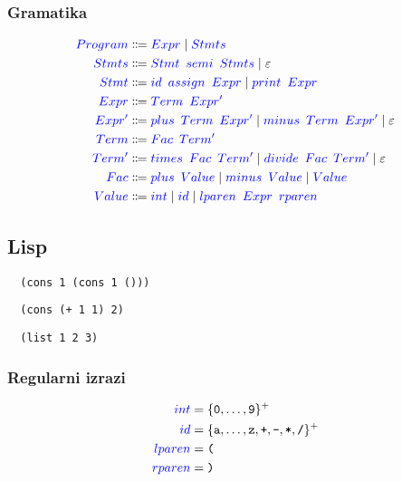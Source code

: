 \documentclass{article}
\newcommand{\Symbol}[1]{\textcolor{blue}{#1}}
\newcommand{\Null}{\varepsilon}
\newcommand{\Char}[1]{\texttt{#1}}
\newcommand{\Arrow}{\Coloneq}
\newcommand{\Seq}{{\ \,}}
\newcommand{\Union}{\mathrel{|}}
\newcommand{\KleenePlus}[1]{#1^+}
\begin{document}
\subsubsection*{Gramatika}
\begin{equation*}
  \begin{aligned}
    \Symbol{Program} &\Arrow \Symbol{Expr} \Union \Symbol{Stmts}\\
    \Symbol{Stmts} &\Arrow \Symbol{Stmt} \Seq \Symbol{semi} \Seq \Symbol{Stmts} \Union \Null\\
    \Symbol{Stmt} &\Arrow \Symbol{id} \Seq \Symbol{assign} \Seq \Symbol{Expr} \Union \Symbol{print} \Seq \Symbol{Expr}\\
    \Symbol{Expr} &\Arrow \Symbol{Term} \Seq \Symbol{Expr'}\\
    \Symbol{Expr'} &\Arrow \Symbol{plus} \Seq \Symbol{Term} \Seq \Symbol{Expr'} \Union \Symbol{minus} \Seq \Symbol{Term} \Seq \Symbol{Expr'} \Union \Null\\
    \Symbol{Term} &\Arrow \Symbol{Fac} \Seq \Symbol{Term'}\\
    \Symbol{Term'} &\Arrow \Symbol{times} \Seq \Symbol{Fac} \Seq \Symbol{Term'} \Union \Symbol{divide} \Seq \Symbol{Fac} \Seq \Symbol{Term'} \Union \Null\\
    \Symbol{Fac} &\Arrow \Symbol{plus} \Seq \Symbol{Value} \Union \Symbol{minus} \Seq \Symbol{Value} \Union \Symbol{Value}\\
    \Symbol{Value} &\Arrow \Symbol{int} \Union \Symbol{id} \Union \Symbol{lparen} \Seq \Symbol{Expr} \Seq \Symbol{rparen}
  \end{aligned}
\end{equation*}

\subsection{Lisp}
\begin{verbatim}
  (cons 1 (cons 1 ()))
\end{verbatim}
\begin{verbatim}
  (cons (+ 1 1) 2)
\end{verbatim}
\begin{verbatim}
  (list 1 2 3)
\end{verbatim}

\subsubsection*{Regularni izrazi}
\begin{equation*}
  \begin{aligned}
    \Symbol{int} &= \KleenePlus{\{\Char{0}, \dots, \Char{9}\}}\\
    \Symbol{id} &= \KleenePlus{\{\Char{a}, \dots, \Char{z}, \Char{+}, \Char{-}, \Char{*}, \Char{/} \}}\\
    \Symbol{lparen} &= \Char{(}\\
    \Symbol{rparen} &= \Char{)}\\
  \end{aligned}
\end{equation*}
\end{document}
